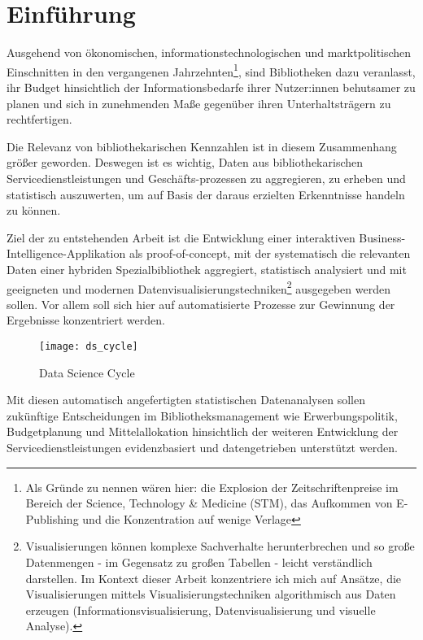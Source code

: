 \chapter{Einführung}
%
Ausgehend von ökonomischen, informationstechnologischen und marktpolitischen Einschnitten in den
vergangenen Jahrzehnten\footnote{Als Gründe zu nennen wären hier: die Explosion der Zeitschriftenpreise im Bereich der
Science, Technology \& Medicine (STM), das Aufkommen von E-Publishing und die Konzentration auf wenige
Verlage},
sind Bibliotheken dazu veranlasst, ihr Budget hinsichtlich der Informationsbedarfe
ihrer Nutzer:innen behutsamer zu planen und sich in zunehmenden Maße gegenüber ihren Unterhaltsträgern zu rechtfertigen.

Die Relevanz von bibliothekarischen Kennzahlen ist in diesem Zusammenhang größer geworden.
Deswegen ist es wichtig, Daten aus bibliothekarischen Servicedienstleistungen und Geschäfts-prozessen zu aggregieren, zu erheben und statistisch
auszuwerten, um auf Basis der daraus erzielten Erkenntnisse handeln zu können.

Ziel der zu entstehenden Arbeit ist die Entwicklung einer
interaktiven Business-Intelligence-Applikation als proof-of-concept,
mit der systematisch die relevanten Daten einer hybriden Spezialbibliothek aggregiert, statistisch
analysiert und mit geeigneten und modernen Datenvisualisierungstechniken\footnote{Visualisierungen können komplexe Sachverhalte herunterbrechen und
so große Datenmengen - im Gegensatz zu großen Tabellen - leicht verständlich
darstellen. Im Kontext dieser Arbeit konzentriere ich mich auf Ansätze, die Visualisierungen mittels Visualisierungstechniken algorithmisch aus
Daten erzeugen (Informationsvisualisierung, Datenvisualisierung und visuelle Analyse).\cite{RN100}}
ausgegeben werden sollen.
Vor allem soll sich hier auf automatisierte Prozesse zur Gewinnung der Ergebnisse konzentriert werden.

\begin{figure}[h]
    \centering
        \texttt{[image: ds\_cycle]}
        \caption{Data Science Cycle}
        \label{fig:data science}
\end{figure}

Mit diesen automatisch angefertigten statistischen Datenanalysen sollen zukünftige
Entscheidungen im Bibliotheksmanagement wie Erwerbungspolitik, Budgetplanung und
Mittelallokation hinsichtlich der weiteren Entwicklung der
Servicedienstleistungen evidenzbasiert und datengetrieben unterstützt werden.

